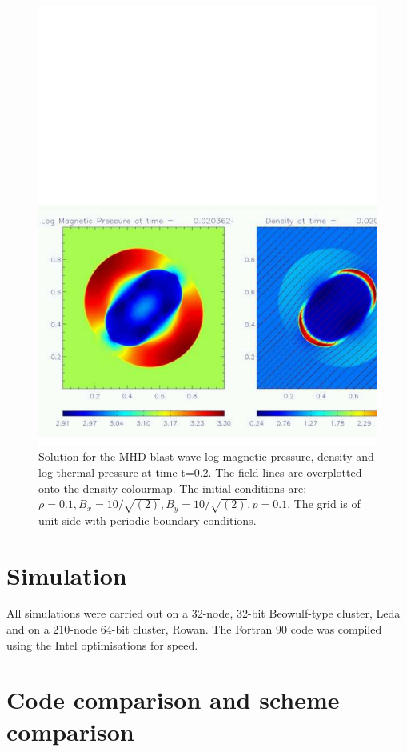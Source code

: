 \begin{figure}[t]
\includegraphics[width=15cm]{mhdblastwavemulti}
\caption{
Solution for the MHD blast wave log magnetic pressure, density and log thermal
pressure  at time t=0.2. The field lines are overplotted onto the density
colourmap. The initial conditions are: $\rho = 0.1, B_x = 10/\sqrt{(2)}, B_y =10/\sqrt{(2)}, p = 0.1 $.  
The grid is of unit side with periodic boundary conditions.
}
\label{fig:3-mhdblastwave} %
\end{figure}

\section{Simulation}
All simulations were carried out on a 32-node, 32-bit Beowulf-type cluster, Leda and on a 210-node 64-bit cluster, Rowan. 
The Fortran 90 code was compiled using the Intel optimisations for speed.

\section{Code comparison and scheme comparison}



